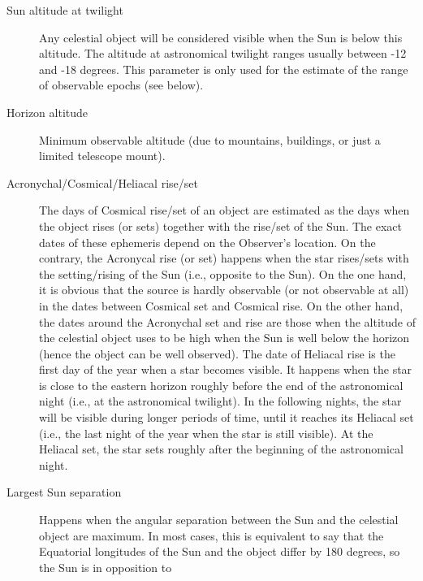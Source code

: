 \begin{description}
\item[Sun altitude at twilight] Any celestial object will be
  considered visible when the Sun is below this altitude. The altitude
  at astronomical twilight ranges usually between -12 and -18
  degrees. This parameter is only used for the estimate of the range
  of observable epochs (see below).
\item[Horizon altitude] Minimum observable altitude (due to mountains,
  buildings, or just a limited telescope mount).
\item[Acronychal/Cosmical/Heliacal rise/set] The days of Cosmical
  rise/set of an object are estimated as the days when the object
  rises (or sets) together with the rise/set of the Sun. The exact
  dates of these ephemeris depend on the Observer's location. On the
  contrary, the Acronycal rise (or set) happens when the star
  rises/sets with the setting/rising of the Sun (i.e., opposite to the
  Sun). On the one hand, it is obvious that the source is hardly
  observable (or not observable at all) in the dates between Cosmical
  set and Cosmical rise. On the other hand, the dates around the
  Acronychal set and rise are those when the altitude of the celestial
  object uses to be high when the Sun is well below the horizon (hence
  the object can be well observed). The date of Heliacal rise is the
  first day of the year when a star becomes visible. It happens when
  the star is close to the eastern horizon roughly before the end of
  the astronomical night (i.e., at the astronomical twilight). In the
  following nights, the star will be visible during longer periods of
  time, until it reaches its Heliacal set (i.e., the last night of the
  year when the star is still visible). At the Heliacal set, the star
  sets roughly after the beginning of the astronomical night.
\item[Largest Sun separation] Happens when the angular separation
  between the Sun and the celestial object are maximum. In most cases,
  this is equivalent to say that the Equatorial longitudes of the Sun
  and the object differ by 180 degrees, so the Sun is in opposition to

\end{description}
